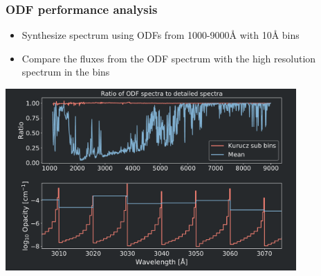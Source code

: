\frame
{
	\frametitle{ODF performance analysis}
	\begin{itemize}
	    \item Synthesize spectrum using ODFs from 1000-9000\si{\angstrom} with 10\si{\angstrom} bins
	    \item Compare the fluxes from the ODF spectrum with the high resolution spectrum in the bins
	\end{itemize}
	\centering
	\includegraphics[width=111mm]{images/odf_vs_non_odf}
}

